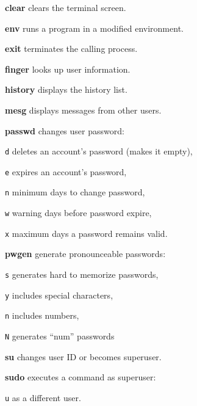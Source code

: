 \begin{enumx}
	\item [\cmd] \textbf{clear} clears the terminal screen.
	\item [\cmd] \textbf{env} runs a program in a modified environment.
	\item [\cmd] \textbf{exit} terminates the calling process.
	\item [\cmd] \textbf{finger} looks up user information.
	\item [\cmd] \textbf{history}  displays the history list. %
	\item [\cmd] \textbf{mesg} displays messages from other users.
\end{enumx}

\begin{enumx}
	\item [\cmd] \textbf{passwd} changes user password:
	\item [\texttt{d}] deletes an account's password (makes it empty),
	\item [\texttt{e}] expires an account's password,
	\item [\texttt{n}] minimum days to change password,
	\item [\texttt{w}] warning days before password expire,
	\item [\texttt{x}] maximum days a password remains valid.
	\item [\cmd] \textbf{pwgen} generate pronounceable passwords:
	\item [\texttt{s}] generates hard to memorize passwords,
	\item [\texttt{y}] includes special characters,
	\item [\texttt{n}] includes numbers,
	\item [\texttt{N}] generates ``num'' passwords
\end{enumx}

\begin{enumx}
        \item [\cmd] \textbf{su} changes user ID or becomes superuser.
        \item [\cmd] \textbf{sudo} executes a command as superuser:
        \item [\texttt{u}] as a different user.
\end{enumx}


